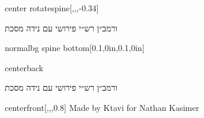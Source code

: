 \documentclass[
coverheight=10.0in,
coverwidth=6.25in,
spinewidth=1.1875in,
bleedwidth=.125in,
marklength=0in,
12pt,
pagecolor=background,
]{bookcover}
\newcommand{\hebtitle}{
ורמב״ן רש״י פירושי עם נידה מסכת}
\newcommand{\engtitle}{
}
\newcommand{\setspineheight}{
\fontsize{0.31875in}{0.31875in}\selectfont}
\newcommand{\hebtext}[1]{
	\begin{hebrew}
		#1
	\end{hebrew}
}
\begin{document}
	\begin{bookcover}
		\begin{bookcoverelement}{center rotate}{spine}[,,,-0.34\coverheight]
			\textcolor{text}{\setspineheight\hebtext{\hebtitle} \space \engtitle }
		\end{bookcoverelement}
		\begin{bookcoverelement}{normal}{bg spine bottom}[0.1\spinewidth,0in,0.1\spinewidth,0in]
		\end{bookcoverelement}
		
		\begin{bookcoverelement}{center}{back}
			\begin{Huge}
				\textcolor{text}{\hebtext{\hebtitle}}
				\textcolor{text}{\engtitle}
			\end{Huge}
			\vspace{2\baselineskip}
			\begin{large}
			\end{large}
		\end{bookcoverelement}
		\begin{bookcoverelement}{center}{front}[,,,0.8\coverheight]
			\textcolor{text}{
Made by Ktavi for Nathan Kasimer		}
		\end{bookcoverelement}
	\end{bookcover}
\end{document}
